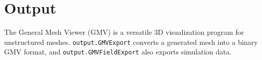 \chapter{Output}
\label{chap:output}

\minitoc

The General Mesh Viewer (GMV) is a versatile 3D visualization program
for unstructured meshes. \texttt{output.GMVExport} converts a
generated mesh into a binary GMV format, and
\texttt{output.GMVFieldExport} also exports simulation data.

